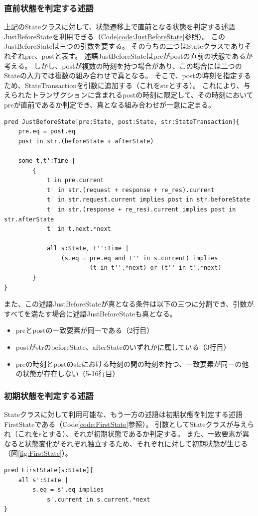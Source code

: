 \documentclass[12pt,a4paper]{jbook}
\begin{document}
\color{red}
\subsubsection{直前状態を判定する述語}
上記のStateクラスに対して、状態遷移上で直前となる状態を判定する述語JustBeforeStateを利用できる（Code\ref{code:JustBeforeState}参照）。
このJustBeforeStateは三つの引数を要する。
そのうちの二つはStateクラスでありそれぞれpre、postと表す。
述語JustBeforeStateはpreがpostの直前の状態であるか考える。
しかし、postが複数の時刻を持つ場合があり、この場合には二つのStateの入力では複数の組み合わせで真となる。
そこで、postの時刻を指定するため、StateTransactionを引数に追加する（これをstrとする）。
これにより、与えられたトランザクションに含まれるpostの時刻に限定して、その時刻においてpreが直前であるか判定でき、真となる組み合わせが一意に定まる。
\begin{lstlisting}[caption=状態遷移において直前の状態を判定する述語, label=code:JustBeforeState]
pred JustBeforeState[pre:State, post:State, str:StateTransaction]{
	pre.eq = post.eq
	post in str.(beforeState + afterState)

	some t,t':Time |
		{
			t in pre.current
			t' in str.(request + response + re_res).current
			t' in str.request.current implies post in str.beforeState
			t' in str.(response + re_res).current implies post in str.afterState
			t' in t.next.*next

			all s:State, t'':Time |
				(s.eq = pre.eq and t'' in s.current) implies
						(t in t''.*next) or (t'' in t'.*next)
		}
}
\end{lstlisting}

また、この述語JustBeforeStateが真となる条件は以下の三つに分割でき、引数がすべてを満たす場合に述語JustBeforeStateも真となる。
\begin{itemize}
\item preとpostの一致要素が同一である（2行目）
\item postがstrのbeforeState、afterStateのいずれかに属している（3行目）
\item preの時刻とpostのstrにおける時刻の間の時刻を持つ、一致要素が同一の他の状態が存在しない（5-16行目）
\end{itemize}

\subsubsection{初期状態を判定する述語}
Stateクラスに対して利用可能な、もう一方の述語は初期状態を判定する述語FirstStateである（Code\ref{code:FirstState}参照）。
引数としてStateクラスが与えられ（これをsとする）、それが初期状態であるか判定する。
また、一致要素が異なると状態変化がそれぞれ独立するため、それぞれに対して初期状態が生じる（図\ref{fig:FirstState}）。
\begin{lstlisting}[caption=状態遷移において初期状態を判定する述語, label=code:FirstState]
pred FirstState[s:State]{
	all s':State |
		s.eq = s'.eq implies
			s'.current in s.current.*next
}
\end{lstlisting}
\color{black}
\end{document}
